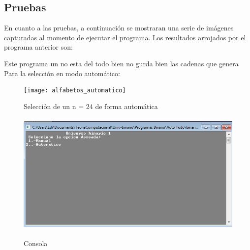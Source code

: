 \documentclass[12pt]{article}
\begin{document}
\newpage
\subsection{Pruebas}
En cuanto a las pruebas, a continuación se mostraran una serie de imágenes capturadas al momento de ejecutar el programa. Los resultados arrojados por el programa anterior son:

Este programa un no esta del todo bien no gurda bien las cadenas que genera\\

Para la selección en modo automático:

\begin{figure}[H]
\texttt{[image: alfabetos\_automatico]}
\label{fig:auto_alfabeto}
\caption{Selección de un n = 24 de forma automática}
\end{figure}

\vspace{1em}

\begin{figure}[H]
\includegraphics[width=\textwidth, height=6cm]{uni}
\label{fig:Universo}
\caption{Consola}
\end{figure}

\vspace{1em}


\newpage
\end{document}

